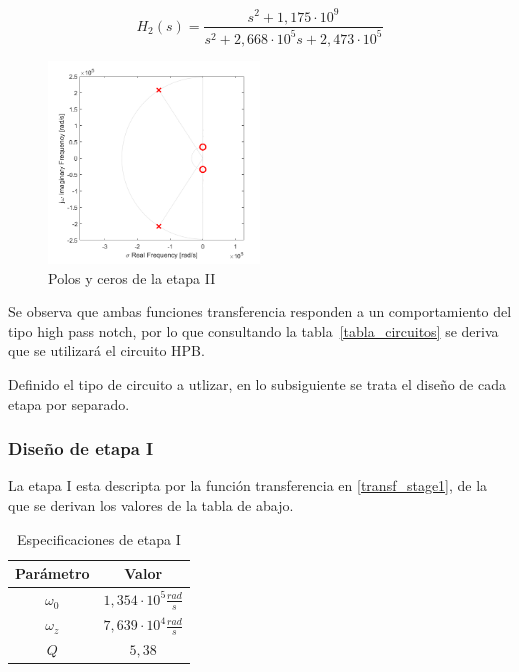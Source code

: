 \begin{equation} 
\label{transf_stage2}
H_2(s) = \frac{s^2 + 1,175 \cdot 10^9}{s^2 + 2,668 \cdot 10^5 s + 2,473 \cdot 10^5}
\end{equation}

\begin{figure}[H] 
    \centering
    \includegraphics[width=0.5\textwidth]{../EJ3/Resources/polezero_stageii.png}
    \caption{Polos y ceros de la etapa II}
    \label{EJ3_PZEII}
\end{figure}

Se observa que ambas funciones transferencia responden a un comportamiento del tipo high pass notch, por lo que consultando la tabla~\ref{tabla_circuitos} se deriva que se utilizar\'a el circuito HPB.

Definido el tipo de circuito a utlizar, en lo subsiguiente se trata el dise\~no de cada etapa por separado.

\subsubsection{Dise\~no de etapa I}

La etapa I esta descripta por la funci\'on transferencia en \ref{transf_stage1}, de la que se derivan los valores de la tabla de abajo.

\begin{table}[H]
    \centering
    \begin{tabular}{c c}
        Par\'ametro & Valor\\
        \hline
         $\omega_0$ & $1,354 \cdot 10^5 \frac{rad}{s}$ \\
	     $\omega_z$ & $7,639 \cdot 10^4 \frac{rad}{s}$  \\
         $Q$ & $5,38$ \\
    \end{tabular}
    \caption{Especificaciones de etapa I}
    \label{tabla_stageI}
\end{table}



